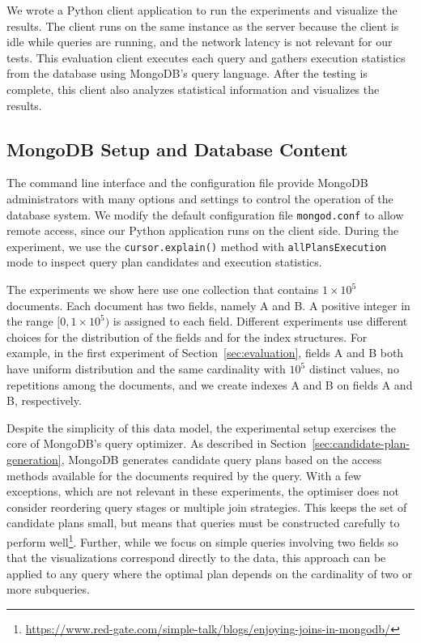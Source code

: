 We wrote a Python client application to run the experiments and visualize the results. The client runs on the same instance as the server because the client is idle while queries are running, and the network latency is not relevant for our tests. This evaluation client executes each query and gathers execution statistics from the database using MongoDB's query language. After the testing is complete, this client also analyzes statistical information and visualizes the results.

\subsection{MongoDB Setup and Database Content}
The command line interface and the configuration file provide MongoDB administrators with many options and settings to control the operation of the database system.  We modify the default configuration file \verb|mongod.conf| to  allow  remote  access,  since our  Python  application  runs  on  the client side. During the experiment, we use the \verb|cursor.explain()| method with \verb|allPlansExecution| mode to inspect query plan candidates and execution statistics. 

The experiments we show here use one collection that contains $1 \times 10^5$ documents. Each document has two fields, namely A and B. A positive integer in the range $[0, 1\times 10^5)$ is assigned to each field. Different experiments use different choices for the distribution of the fields and for the index structures. For example, in the first experiment of Section~\ref{sec:evaluation}, fields A and B both have uniform distribution and the same cardinality with $10^5$ distinct values, no repetitions among the documents, and we create indexes A and B on fields A and B, respectively.

Despite the simplicity of this data model, the experimental setup exercises the core of MongoDB's query optimizer. As described in Section~\ref{sec:candidate-plan-generation}, MongoDB generates candidate query plans based on the access methods available for the documents required by the query. With a few exceptions, which are not relevant in these experiments, the optimiser does not consider reordering query stages or multiple join strategies. This keeps the set of candidate plans small, but means that queries must be constructed carefully to perform well\footnote{\url{https://www.red-gate.com/simple-talk/blogs/enjoying-joins-in-mongodb/}}. Further, while we focus on simple queries involving two fields so that the visualizations correspond directly to the data, this approach can be applied to any query where the optimal plan depends on the cardinality of two or more subqueries.

